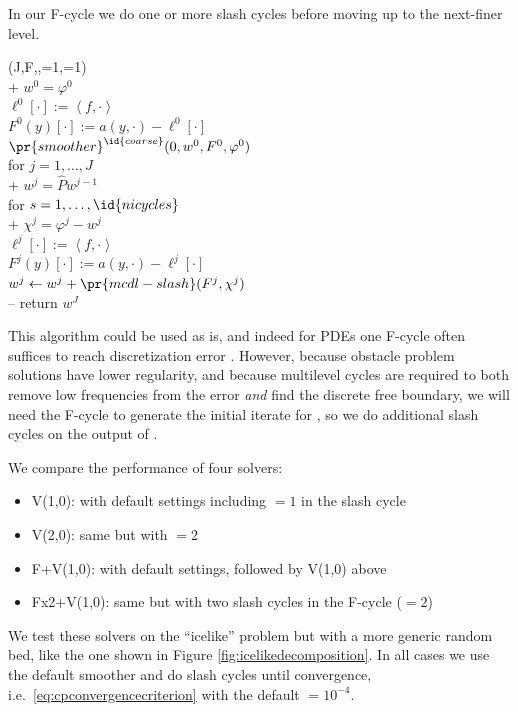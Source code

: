 \documentclass[letterpaper,final,12pt,reqno]{amsart}
\theoremstyle{claim}
\newcommand{\ip}[2]{\left<#1,#2\right>}
\numberwithin{equation}{section}
\numberwithin{figure}{section}
\numberwithin{table}{section}
\numberwithin{theorem}{section}
\begin{document}
In our F-cycle we do one or more slash cycles before moving up to the next-finer level.
\begin{pseudo*} \label{ps:mcdl-fcycle}
(J,F,\varphi,=1,=1)\text{:} \\+
    $w^0=\varphi^0$ \qquad\qquad\qquad\qquad\qquad\quad {} \\
    $\ell^0[\cdot] := \ip{f}{\cdot}$ \\
    $F^0(y)[\cdot] := a(y,\cdot) - \ell^0[\cdot]$ \\
    $\pr{smoother}^{\id{coarse}}(0,w^0,F^0,\varphi^0)$ \\
    for $j=1,\dots,J$ \\+
        $w^j = \hat P w^{j-1}$ \qquad\qquad\qquad\qquad {} \\
        for $s=1,\dots,\id{nicycles}$ \qquad\qquad\qquad {} \\+
            $\chi^j = \varphi^j - w^j$ \\
            $\ell^j[\cdot] := \ip{f}{\cdot}$ \\
            $F^j(y)[\cdot] := a(y,\cdot) - \ell^j[\cdot]$ \\
            $w^j \gets w^j+\pr{mcdl-slash}(F^j,\chi^j)$ \\--
    return $w^J$
\end{pseudo*}

This algorithm could be used as is, and indeed for PDEs one F-cycle often suffices to reach discretization error \cite{Trottenbergetal2001}.  However, because obstacle problem solutions have lower regularity, and because multilevel cycles are required to both remove low frequencies from the error \emph{and} find the discrete free boundary, we will need the F-cycle to generate the initial iterate for , so we do additional slash cycles on the output of .

We compare the performance of four solvers:
\begin{itemize}
\item \textsf{V(1,0)}:  with default settings including $=1$ in the slash cycle
\item \textsf{V(2,0)}: same but with $=2$
\item \textsf{F+V(1,0)}:  with default settings, followed by \textsf{V(1,0)} above
\item \textsf{Fx2+V(1,0)}: same but with two slash cycles in the F-cycle ($=2$)
\end{itemize}
We test these solvers on the ``icelike'' problem but with a more generic random bed, like the one shown in Figure \ref{fig:icelikedecomposition}.  In all cases we use the default  smoother and do slash cycles until convergence, i.e.~\eqref{eq:cpconvergencecriterion} with the default  $=10^{-4}$.
\end{document}
